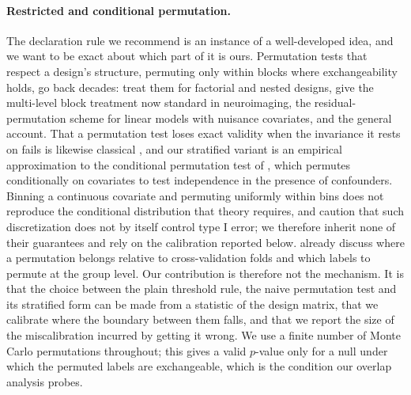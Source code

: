 \documentclass[journal=dce]{CUP-JNL-DTM}%
\begin{document}
\paragraph{Restricted and conditional permutation.}
The declaration rule we recommend is an instance of a well-developed idea, and we want to be exact about which part of it is ours. Permutation tests that respect a design's structure, permuting only within blocks where exchangeability holds, go back decades: \citet{anderson2003permutation} treat them for factorial and nested designs, \citet{winkler2015multilevel} give the multi-level block treatment now standard in neuroimaging, \citet{freedman1983nonstochastic} the residual-permutation scheme for linear models with nuisance covariates, and \citet{good2005permutation} the general account. That a permutation test loses exact validity when the invariance it rests on fails is likewise classical \citep{romano1990behavior}, and our stratified variant is an empirical approximation to the conditional permutation test of \citet{berrett2020conditional}, which permutes conditionally on covariates to test independence in the presence of confounders. Binning a continuous covariate and permuting uniformly within bins does not reproduce the conditional distribution that theory requires, and \citeauthor{berrett2020conditional} caution that such discretization does not by itself control type I error; we therefore inherit none of their guarantees and rely on the calibration reported below. \citet{etzel2013mvpa} already discuss where a permutation belongs relative to cross-validation folds and which labels to permute at the group level. Our contribution is therefore not the mechanism. It is that the choice between the plain threshold rule, the naive permutation test and its stratified form can be made from a statistic of the design matrix, that we calibrate where the boundary between them falls, and that we report the size of the miscalibration incurred by getting it wrong. We use a finite number of Monte Carlo permutations throughout; this gives a valid $p$-value only for a null under which the permuted labels are exchangeable, which is the condition our overlap analysis probes.
\end{document}
